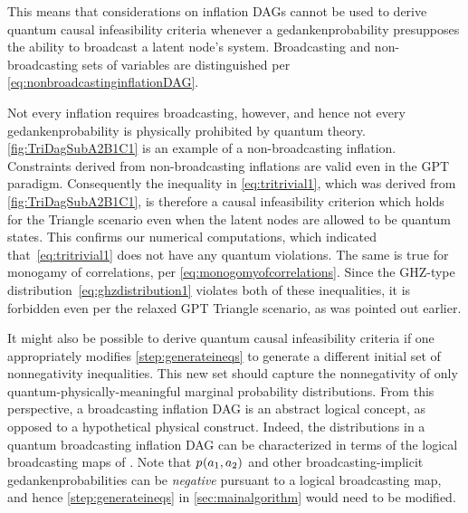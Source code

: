 This means that considerations on inflation DAGs cannot be used to derive quantum causal infeasibility criteria whenever a gedankenprobability presupposes the ability to broadcast a latent node's system. Broadcasting and non-broadcasting sets of variables are distinguished per \cref{eq:nonbroadcastinginflationDAG}.


Not every inflation requires broadcasting, however, and hence not every gedankenprobability is physically prohibited by quantum theory. 
\cref{fig:TriDagSubA2B1C1} is an example of a non-broadcasting inflation.
Constraints derived from non-broadcasting inflations are valid even in the GPT paradigm. Consequently the inequality in \cref{eq:tritrivial1}, which was derived from \cref{fig:TriDagSubA2B1C1}, is therefore a causal infeasibility criterion which holds for the Triangle scenario even when the latent nodes are allowed to be quantum states. This confirms our numerical computations, which indicated that~\eqref{eq:tritrivial1} does not have any quantum violations. The same is true for monogamy of correlations, per \cref{eq:monogomyofcorrelations}. Since the GHZ-type distribution~\cref{eq:ghzdistribution1} violates both of these inequalities, it is forbidden even per the relaxed GPT Triangle scenario, as was pointed out earlier. 

It might also be possible to derive quantum causal infeasibility criteria if one appropriately modifies \cref{step:generateineqs} to generate a different initial set of nonnegativity inequalities. This new set should capture the nonnegativity of only quantum-physically-meaningful marginal probability distributions. From this perspective, a broadcasting inflation DAG is an abstract logical concept, as opposed to a hypothetical physical construct. Indeed, the distributions in a quantum broadcasting inflation DAG can be characterized in terms of the logical broadcasting maps of \citet{Coecke2011}. Note that ${p_{}}\lparen a_1,a_2\rparen$ and other broadcasting-implicit gedankenprobabilities can be \emph{negative} pursuant to a logical broadcasting map, and hence \cref{step:generateineqs} in \cref{sec:mainalgorithm} would need to be modified.

